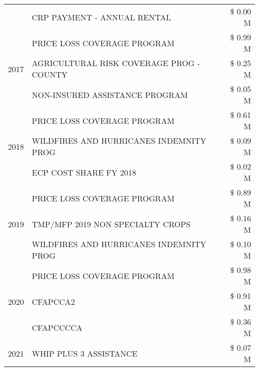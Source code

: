 \begin{tabular}{llr}
 & CRP PAYMENT - ANNUAL RENTAL                   & \$ 0.00 M \\
\cline{1-3}
\multirow[t]{3}{*}{2017} & PRICE LOSS COVERAGE PROGRAM & \$ 0.99 M \\
 & AGRICULTURAL RISK COVERAGE PROG - COUNTY & \$ 0.25 M \\
 & NON-INSURED ASSISTANCE PROGRAM & \$ 0.05 M \\
\cline{1-3}
\multirow[t]{3}{*}{2018} & PRICE LOSS COVERAGE PROGRAM & \$ 0.61 M \\
 & WILDFIRES AND HURRICANES INDEMNITY PROG & \$ 0.09 M \\
 & ECP COST SHARE FY 2018 & \$ 0.02 M \\
\cline{1-3}
\multirow[t]{3}{*}{2019} & PRICE LOSS COVERAGE PROGRAM & \$ 0.89 M \\
 & TMP/MFP 2019 NON SPECIALTY CROPS & \$ 0.16 M \\
 & WILDFIRES AND HURRICANES INDEMNITY PROG & \$ 0.10 M \\
\cline{1-3}
\multirow[t]{3}{*}{2020} & PRICE LOSS COVERAGE PROGRAM & \$ 0.98 M \\
 & CFAPCCA2 & \$ 0.91 M \\
 & CFAPCCCCA & \$ 0.36 M \\
\cline{1-3}
2021 & WHIP PLUS 3 ASSISTANCE & \$ 0.07 M \\
\cline{1-3}
\bottomrule
\end{tabular}
